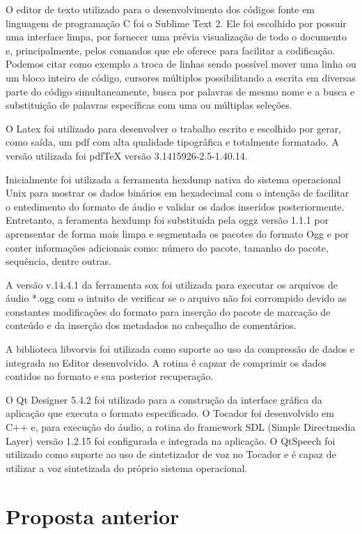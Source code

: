 O editor de texto utilizado para o desenvolvimento dos códigos fonte em linguagem de programação C foi o Sublime Text 2. Ele foi escolhido por possuir uma interface limpa, por fornecer uma prévia visualização de todo o documento e, principalmente, pelos comandos que ele oferece para facilitar a codificação. Podemos citar como exemplo a troca de linhas sendo possível mover uma linha ou um bloco inteiro de código, cursores múltiplos possibilitando a escrita em diversas parte do código simultaneamente, busca por palavras de mesmo nome e a busca e substituição de palavras específicas com uma ou múltiplas seleções.

O Latex foi utilizado para desenvolver o trabalho escrito e escolhido por gerar, como saída, um pdf com alta qualidade tipográfica e totalmente formatado. A versão utilizada foi pdfTeX versão 3.1415926-2.5-1.40.14.

Inicialmente foi utilizada a ferramenta hexdump nativa do sistema operacional Unix para mostrar os dados binários em hexadecimal com o intenção de facilitar o entedimento do formato de áudio e validar os dados inseridos posteriormente. Entretanto, a feramenta hexdump foi substituída pela oggz versão 1.1.1 por aprensentar de forma mais limpa e segmentada os pacotes do formato Ogg e por conter informações adicionais como: número do pacote, tamanho do pacote, sequência, dentre outras.

A versão v.14.4.1 da ferramenta sox foi utilizada para executar os arquivos de áudio *.ogg com o intuito de verificar se o arquivo não foi corrompido devido as constantes modificações do formato para inserção do pacote de marcação de conteúdo e da inserção dos metadados no cabeçalho de comentários.

A biblioteca libvorvis foi utilizada como suporte ao uso da compressão de dados e integrada no Editor desenvolvido. A rotina é capzar de comprimir os dados contidos no formato e sua posterior recuperação.

O Qt Designer 5.4.2 foi utilizado para a construção da interface gráfica da aplicação que executa o formato especificado. O Tocador foi desenvolvido em C++ e, para execução do áudio, a rotina do framework SDL (Simple Directmedia Layer) versão 1.2.15 foi configurada e integrada na aplicação. O QtSpeech foi utilizado como suporte ao uso de sintetizador de voz no Tocador e é capaz de utilizar a voz sintetizada do próprio sistema operacional. 

\section{Proposta anterior}

